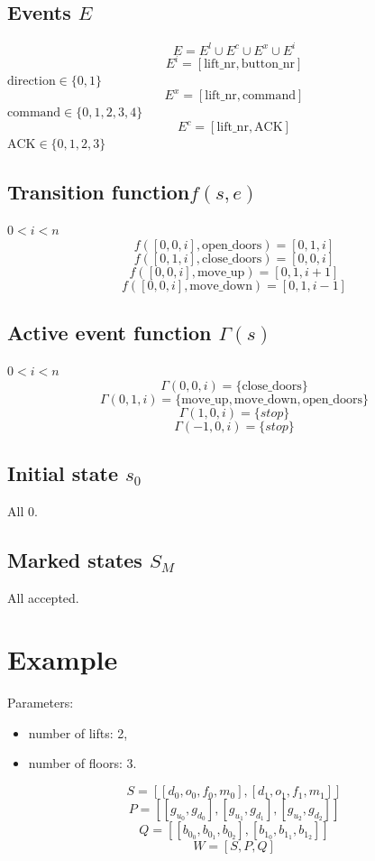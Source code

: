 \documentclass{article}
\begin{document}
\subsection{Events \(E\)}

\[ E = E^l \cup E^c \cup E^x \cup E^i \]
\[ E^i = [\text{lift\_nr},\text{button\_nr}] \]
\(\text{direction} \in \{0,1\}\)
\[ E^x = [\text{lift\_nr}, \text{command}] \]
\(\text{command} \in \{0,1,2,3,4\}\)
\[ E^c = [\text{lift\_nr}, \text{ACK}] \]
\(\text{ACK} \in \{0,1,2,3\}\)

\subsection{Transition function\(f(s,e)\)}
\(0 < i < n\)
\[ f([0,0,i],\text{open\_doors}) = [0,1,i]\]
\[ f([0,1,i],\text{close\_doors}) = [0,0,i]\]
\[ f([0,0,i],\text{move\_up}) = [0,1,i+1]\]
\[ f([0,0,i],\text{move\_down}) = [0,1,i-1]\]

\subsection{Active event function \(\Gamma(s)\)}
\(0 < i < n\)
\[ \Gamma(0,0,i) = \{\text{close\_doors}\}\]
\[ \Gamma(0,1,i) = \{\text{move\_up},\text{move\_down},\text{open\_doors}\}\]
\[ \Gamma(1,0,i) = \{stop\}\]
\[ \Gamma(-1,0,i) = \{stop\}\]

\subsection{Initial state \(s_0\)}
All 0.

\subsection{Marked states \(S_M\)}
All accepted.


\section{Example}

Parameters:
\begin{itemize}
  \item number of lifts: 2,
  \item number of floors: 3.
\end{itemize}

\[ S = [ [d_0, o_0, f_0, m_0], [d_1, o_1, f_1, m_1] ] \]
\[ P = [ [g_{u_0}, g_{d_0}], [g_{u_1}, g_{d_1}], [g_{u_2}, g_{d_2}] ] \]
\[ Q = [ [b_{0_0},b_{0_1},b_{0_2}], [b_{1_0},b_{1_1},b_{1_2}] ] \]
\[ W=[S,P,Q] \]
\end{document}
